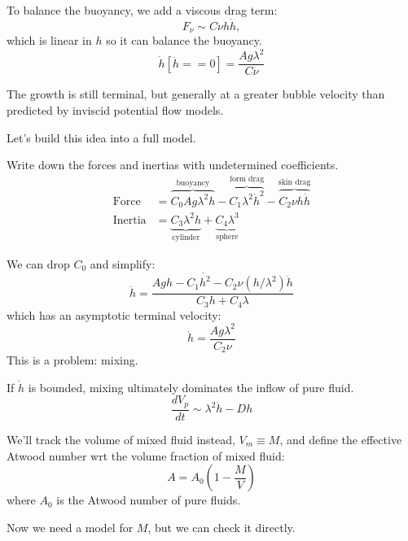 \documentclass[12pt]{beamer}
\begin{document}
\begin{frame}
To balance the buoyancy, we add a viscous drag term:
\begin{equation*}
F_\nu \sim C \nu h \dot{h},
\end{equation*}
which is linear in $h$ so it can balance the buoyancy.
\begin{equation*}
\dot{h}\left[\ddot{h} == 0\right] = \frac{A g \lambda^2}{C \nu}
\end{equation*}
\pause

The growth is still terminal, but generally at a greater bubble velocity than predicted by inviscid potential flow models.
\vspace{20pt} \pause

Let's build this idea into a full model.
\end{frame}

\begin{frame}
Write down the forces and inertias with undetermined coefficients.
\begin{align*}
\text{Force} &= \overbrace{C_0 A g \lambda^2 h}^{\text{buoyancy}} - \overbrace{C_1 \lambda^2 \dot{h}^2}^{\text{form drag}} - \overbrace{C_2 \nu h \dot{h}}^{\text{skin drag}} \\
\text{Inertia} &= \underbrace{C_3 \lambda^2 h}_{\text{cylinder}} + \underbrace{C_4 \lambda^3}_{\text{sphere}}
\end{align*}\pause

We can drop $C_0$ and simplify:
\begin{equation*}
\ddot{h} = \frac{A g h - C_1 \dot{h^2} - C_2 \nu (h/\lambda^2) \dot{h}}{C_3 h + C_4 \lambda}
\end{equation*}
which has an asymptotic terminal velocity:
\begin{equation*}
\dot{h} = \frac{A g \lambda^2}{C_2 \nu}
\end{equation*}\pause
This is a problem: mixing.
\end{frame}

\begin{frame}
If $\dot{h}$ is bounded, mixing ultimately dominates the inflow of pure fluid.
\begin{equation*}
\frac{d V_p}{dt} \sim \lambda^2 \dot{h} - D h 
\end{equation*}
\pause

We'll track the volume of mixed fluid instead, $V_m \equiv M$, and define the effective Atwood number wrt the volume fraction of mixed fluid:
\begin{equation*}
A = A_0 \left(1 - \frac{M}{V}\right)
\end{equation*}
where $A_0$ is the Atwood number of pure fluids.
\vspace{20pt} \pause

Now we need a model for $M$, but we can check it directly.
\end{frame}
\end{document}

